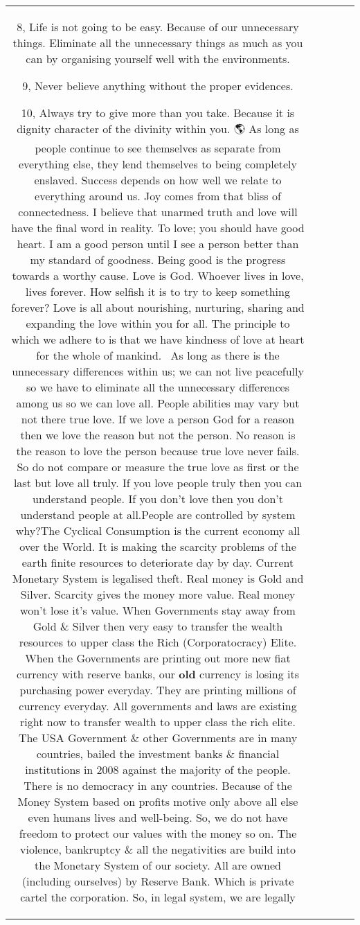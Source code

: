 \documentclass[11pt]{article}
\newlength\mylength
\begin{document}
\begin{center}
\begin{longtable}{|C{.65\mylength}|C{.30\mylength}|C{.12\mylength}|C{.12\mylength}|C{.12\mylength}|}
8, Life is not going to be easy. Because of our unnecessary things. Eliminate all the unnecessary things as much as you can by organising yourself well with the environments. 

9, Never believe anything without the proper evidences. 

10, Always try to give more than you take. 
Because it is dignity character of the divinity within you.
🌎 As long as people continue to see themselves as separate from everything else, they lend themselves to being completely enslaved. Success depends on how well we relate to everything around us. Joy comes from that bliss of connectedness. I believe that unarmed truth and love will have the final word in reality. To love; you should have good heart. I am a good person until I see a person better than my standard of goodness. Being good is the progress towards a worthy cause. Love is God. Whoever lives in love, lives forever. How selfish it is to try to keep something forever? Love is all about nourishing, nurturing, sharing and expanding the love within you for all. The principle to which we adhere to is that we have kindness of love at heart for the whole of mankind.  As long as there is the unnecessary differences within us; we can not live peacefully so we have to eliminate all the unnecessary differences among us so we can love all. People abilities may vary but not there true love. If we love a person God for a reason then we love the reason but not the person. No reason is the reason to love the person because true love never fails. So do not compare or measure the true love as first or the last but love all truly. If you love people truly then you can understand people. If you don't love then you don't understand people at all.People are controlled by system why?The Cyclical Consumption is the current economy all over the World. It is making the scarcity problems of the earth finite resources to deteriorate day by day. Current Monetary System is legalised theft. Real money is Gold and Silver. Scarcity gives the money more value. Real money won't lose it's value. When Governments stay away from Gold \& Silver then very easy to transfer the wealth  resources to upper class the Rich (Corporatocracy) Elite. When the Governments are printing out more new fiat currency with reserve banks, our \textbf{old} currency is losing its purchasing power everyday. They are printing millions of currency everyday. All governments and laws are existing right now to transfer wealth to upper class the rich elite. The USA Government \& other Governments are in many countries, bailed the investment banks \& financial institutions in 2008 against the majority of the people. There is no democracy in any countries. Because of the Money System based on profits motive only above all else even humans lives and well-being. So, we do not have freedom to protect our values with the money so on. The violence, bankruptcy \& all the negativities are build into the Monetary System of our society. All are owned (including ourselves) by Reserve Bank. Which is private cartel the corporation. So, in legal system, we are legally 
\end{longtable}
\end{center}
\end{document}
